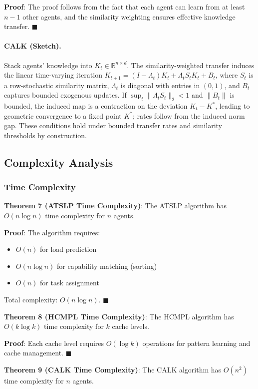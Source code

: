 \documentclass[conference]{IEEEtran}
\begin{document}
\textbf{Proof}: The proof follows from the fact that each agent can learn from at least $n-1$ other agents, and the similarity weighting ensures effective knowledge transfer. $\blacksquare$

\paragraph{CALK (Sketch).} Stack agents' knowledge into $K_t \in \mathbb{R}^{n\times d}$. The similarity-weighted transfer induces the linear time-varying iteration $K_{t+1} = (I - \Lambda_t)K_t + \Lambda_t S_t K_t + B_t$, where $S_t$ is a row-stochastic similarity matrix, $\Lambda_t$ is diagonal with entries in $(0,1)$, and $B_t$ captures bounded exogenous updates. If $\sup_t \|\Lambda_t S_t\|_2 < 1$ and $\|B_t\|$ is bounded, the induced map is a contraction on the deviation $K_t - K^*$, leading to geometric convergence to a fixed point $K^*$; rates follow from the induced norm gap. These conditions hold under bounded transfer rates and similarity thresholds by construction.

\subsection{Complexity Analysis}

\subsubsection{Time Complexity}

\textbf{Theorem 7 (ATSLP Time Complexity)}: The ATSLP algorithm has $O(n \log n)$ time complexity for $n$ agents.

\textbf{Proof}: The algorithm requires:
\begin{itemize}
\item $O(n)$ for load prediction
\item $O(n \log n)$ for capability matching (sorting)
\item $O(n)$ for task assignment
\end{itemize}
Total complexity: $O(n \log n)$. $\blacksquare$

\textbf{Theorem 8 (HCMPL Time Complexity)}: The HCMPL algorithm has $O(k \log k)$ time complexity for $k$ cache levels.

\textbf{Proof}: Each cache level requires $O(\log k)$ operations for pattern learning and cache management. $\blacksquare$

\textbf{Theorem 9 (CALK Time Complexity)}: The CALK algorithm has $O(n^2)$ time complexity for $n$ agents.
\end{document}
